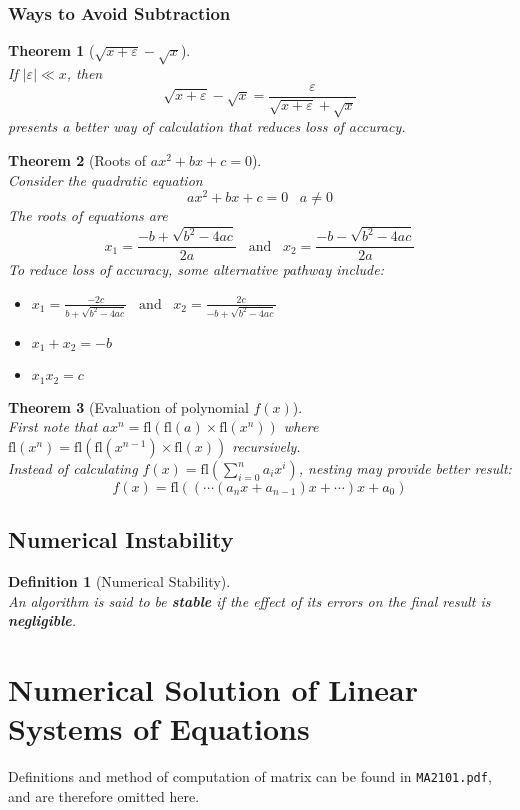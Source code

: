 \documentclass[12pt]{article}
\newtheorem{definition}{Definition}[section]
\newtheorem{theorem}{Theorem}[section]
\theoremstyle{definition}
\newcommand\fl[1]{\text{fl}\left(#1\right)}
\begin{document}
\subsubsection{Ways to Avoid Subtraction} 
\begin{theorem}[$\sqrt{x+\varepsilon}-\sqrt{x}$]
\hfill\\\normalfont If $|\varepsilon|\ll x$, then 
\[
\sqrt{x+\varepsilon}-\sqrt{x}=\frac{\varepsilon}{\sqrt{x+\varepsilon}+\sqrt{x}}
\]
presents a better way of calculation that reduces loss of accuracy.
\end{theorem}
\begin{theorem}[Roots of $ax^2+bx+c=0$]
\hfill\\\normalfont Consider the quadratic equation
\[
ax^2+bx+c = 0\;\;\;a\neq 0
\]
The roots of equations are
\[
x_1=\frac{-b+\sqrt{b^2-4ac}}{2a}\;\;\;\text{and}\;\;\;x_2=\frac{-b-\sqrt{b^2-4ac}}{2a}
\]
To reduce loss of accuracy, some alternative pathway include:
\begin{itemize}
\item $x_1=\frac{-2c}{b+\sqrt{b^2-4ac}}\;\;\;\text{and}\;\;\;x_2=\frac{2c}{-b+\sqrt{b^2-4ac}}$
\item $x_1+x_2 = -b$
\item $x_1x_2=c$
\end{itemize}
\end{theorem}
\begin{theorem}[Evaluation of polynomial $f(x)$]
\hfill\\\normalfont First note that $ax^n = \fl{\fl{a}\times\fl{x^n}}$ where $\fl{x^n}=\fl{\fl{x^{n-1}}\times\fl{x}}$ recursively.\\Instead of calculating $f(x) = \fl{\sum_{i=0}^n a_ix^i}$, nesting may provide better result:
\[
f(x)=\fl{(\cdots(a_nx+a_{n-1})x+\cdots)x+a_0}
\]
\end{theorem}
\subsection{Numerical Instability}
\begin{definition}[Numerical Stability]
\hfill\\\normalfont An algorithm is said to be \textbf{stable} if the effect of its errors on the final result is \textbf{negligible}.
\end{definition}
\clearpage
\section{Numerical Solution of Linear Systems of Equations}
Definitions and method of computation of matrix can be found in \texttt{MA2101.pdf}, and are therefore omitted here.
\end{document}
